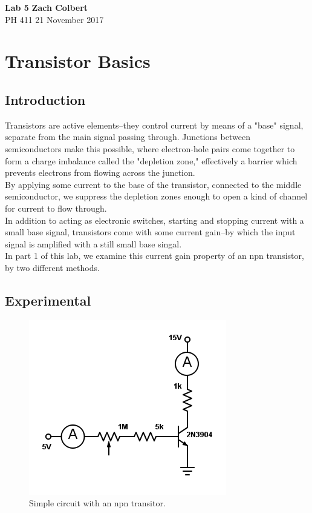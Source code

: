 \documentclass[11pt]{article}
\begin{document}
\noindent
\large\textbf{Lab 5} \hfill \textbf{Zach Colbert} \\
\normalsize PH 411 \hfill 21 November 2017\\

\section{Transistor Basics}
\subsection{Introduction}

Transistors are active elements--they control current by means of a "base" signal, separate from the main signal passing through. Junctions between semiconductors make this possible, where electron-hole pairs come together to form a charge imbalance called the "depletion zone," effectively a barrier which prevents electrons from flowing across the junction.\\

By applying some current to the base of the transistor, connected to the middle semiconductor, we suppress the depletion zones enough to open a kind of channel for current to flow through.\\

In addition to acting as electronic switches, starting and stopping current with a small base signal, transistors come with some current gain--by which the input signal is amplified with a still small base singal.\\

In part 1 of this lab, we examine this current gain property of an npn transistor, by two different methods.\\

\subsection{Experimental}

\begin{figure}[H]
    \centering
    \includegraphics[scale=0.4]{Diagrams/c-1c.png}
    \caption{Simple circuit with an npn transitor.}
    \label{circuit:1c}
\end{figure} 
\end{document}
